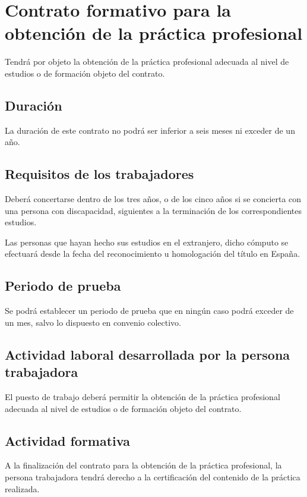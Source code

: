 \documentclass{article}
\begin{document}
	\section*{Contrato formativo para la obtención de la práctica profesional}
	
	Tendrá por objeto la obtención de la práctica profesional adecuada al nivel de estudios o de formación objeto del contrato.
	
	\subsection*{Duración}
	
	La duración de este contrato no podrá ser inferior a seis meses ni exceder de un año.
	
	\subsection*{Requisitos de los trabajadores}
	
	Deberá concertarse dentro de los tres años, o de los cinco años si se concierta con una persona con discapacidad, siguientes a la terminación de los correspondientes estudios.
	
	Las personas que hayan hecho sus estudios en el extranjero, dicho cómputo se efectuará desde la fecha del reconocimiento u homologación del título en España.
	
	\subsection*{Periodo de prueba}
	
	Se podrá establecer un periodo de prueba que en ningún caso podrá exceder de un mes, salvo lo dispuesto en convenio colectivo.
	
	\subsection*{Actividad laboral desarrollada por la persona trabajadora}
	
	El puesto de trabajo deberá permitir la obtención de la práctica profesional adecuada al nivel de estudios o de formación objeto del contrato.
	
	\subsection*{Actividad formativa}
	
	A la finalización del contrato para la obtención de la práctica profesional, la persona trabajadora tendrá derecho a la certificación del contenido de la práctica realizada.
	
\end{document}

